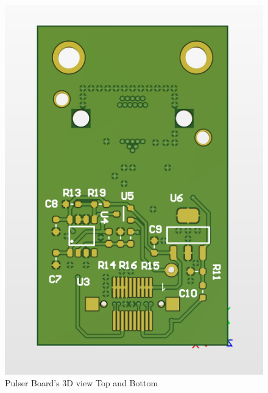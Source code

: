 \documentclass[a4paper,11pt]{article}
\begin{document}
\begin{figure}[htbp]
\includegraphics[scale=0.5]{PulserBoard0.93DBottom.png}
\caption{Pulser Board's 3D view Top and Bottom\label{fig:PulserBoard0.93DTopandBottom}}
\end{figure}
\end{document}

